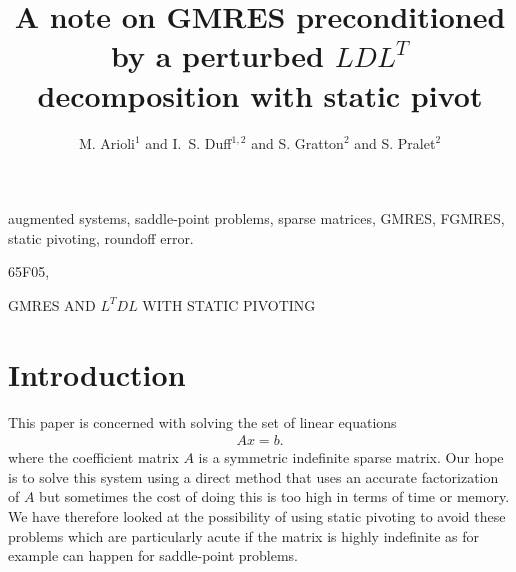 \documentclass{siamltex}
\begin{document}

\title{A note on GMRES preconditioned by a perturbed $L D L^T$ decomposition with static pivot}
\author{M. Arioli$^{1}$ and I.~S. Duff$^{1,2}$ and S. Gratton$^{2}$ and S. Pralet$^{2}$}


\maketitle



\begin{abstract}

\end{abstract}
\begin{keywords}
  augmented systems, saddle-point problems, sparse matrices, GMRES, FGMRES,
  static pivoting, roundoff error.
\end{keywords}
\begin{AMS}
65F05,
\end{AMS}

\pagestyle{myheadings}
\thispagestyle{plain}
{GMRES AND $L^TDL$ WITH STATIC PIVOTING}

\section{Introduction}
This paper is concerned with solving the set of linear equations
\begin{eqnarray}\label{Ax=b}
A x = b.
\end{eqnarray}
where the coefficient matrix $A$ is a symmetric indefinite sparse matrix.
Our hope is to solve this system using a direct method that uses an
accurate factorization of $A$  but sometimes the
cost of doing this is too high in terms of time or memory.  We have therefore
looked
at the possibility of using static pivoting to avoid these problems which
are particularly acute if the matrix is highly indefinite as for example can
happen for saddle-point problems.
\end{document}
